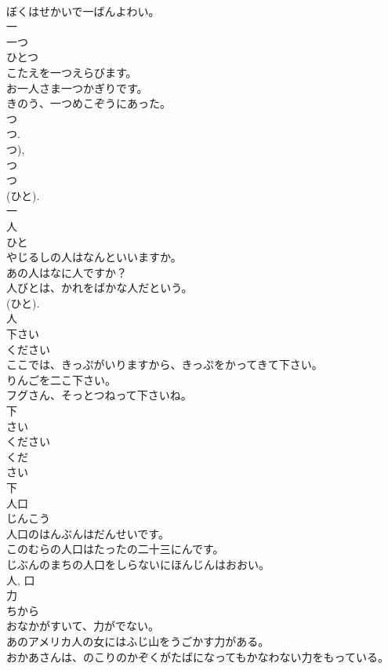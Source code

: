 \documentclass[8pt]{extreport}
\begin{document}
\begin{CJK}{UTF8}{min}
\\	ぼくはせかいで一ばんよわい。	
\\	一	
\\	一つ	
\\	ひとつ	
\\	こたえを一つえらびます。	
\\	お一人さま一つかぎりです。	
\\	きのう、一つめこぞうにあった。	
\\	つ 
\\	つ. 
\\	つ), 
\\	つ 
\\	つ 
\\	(ひと). 
\\	一	
\\	人	
\\	ひと	
\\	やじるしの人はなんといいますか。	
\\	あの人はなに人ですか？	
\\	人びとは、かれをばかな人だという。	
\\	(ひと). 
\\	人	
\\	下さい	
\\	ください	
\\	ここでは、きっぷがいりますから、きっぷをかってきて下さい。	
\\	りんごを二こ下さい。	
\\	フグさん、そっとつねって下さいね。	
\\	下 
\\	さい 
\\	ください 
\\	くだ 
\\	さい 
\\	下	
\\	人口	
\\	じんこう	
\\	人口のはんぶんはだんせいです。	
\\	このむらの人口はたったの二十三にんです。	
\\	じぶんのまちの人口をしらないにほんじんはおおい。	
\\	人, 口	
\\	力	
\\	ちから	
\\	おなかがすいて、力がでない。	
\\	あのアメリカ人の女にはふじ山をうごかす力がある。	
\\	おかあさんは、のこりのかぞくがたばになってもかなわない力をもっている。	

\end{CJK}
\end{document}
